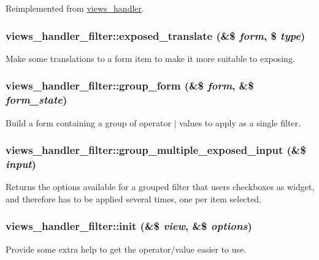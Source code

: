 Reimplemented from \hyperlink{classviews__handler_a2f16176116ecd86a8f8c60a2bc1ebd54}{views\_\-handler}.\hypertarget{classviews__handler__filter_a08e8d0f9aa1a45ee427f1a8ec63fca91}{
\subsubsection[{exposed\_\-translate}]{\setlength{\rightskip}{0pt plus 5cm}views\_\-handler\_\-filter::exposed\_\-translate (\&\$ {\em form}, \/  \$ {\em type})}}
\label{classviews__handler__filter_a08e8d0f9aa1a45ee427f1a8ec63fca91}
Make some translations to a form item to make it more suitable to exposing. \hypertarget{classviews__handler__filter_a27ce821a21b8b221377d98823a83efff}{
\subsubsection[{group\_\-form}]{\setlength{\rightskip}{0pt plus 5cm}views\_\-handler\_\-filter::group\_\-form (\&\$ {\em form}, \/  \&\$ {\em form\_\-state})}}
\label{classviews__handler__filter_a27ce821a21b8b221377d98823a83efff}
Build a form containing a group of operator $|$ values to apply as a single filter. \hypertarget{classviews__handler__filter_ac3d1e34084f50693c6065f1d4eac8361}{
\subsubsection[{group\_\-multiple\_\-exposed\_\-input}]{\setlength{\rightskip}{0pt plus 5cm}views\_\-handler\_\-filter::group\_\-multiple\_\-exposed\_\-input (\&\$ {\em input})}}
\label{classviews__handler__filter_ac3d1e34084f50693c6065f1d4eac8361}
Returns the options available for a grouped filter that users checkboxes as widget, and therefore has to be applied several times, one per item selected. \hypertarget{classviews__handler__filter_a4c1eb0bdb4f81b5a2b2de137e1ffe2cd}{
\subsubsection[{init}]{\setlength{\rightskip}{0pt plus 5cm}views\_\-handler\_\-filter::init (\&\$ {\em view}, \/  \&\$ {\em options})}}
\label{classviews__handler__filter_a4c1eb0bdb4f81b5a2b2de137e1ffe2cd}
Provide some extra help to get the operator/value easier to use.

